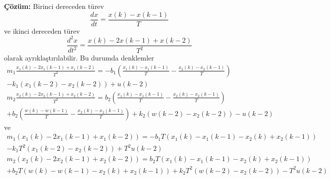 \noindent\textbf{Çözüm:} 
Birinci dereceden türev
\begin{equation}
    \frac{dx}{dt}=\frac{x(k)-x(k-1)}{T}
\end{equation}
ve ikinci dereceden türev 
\begin{equation}
    \frac{d^2x}{dt^2}=\frac{x(k)-2x(k-1)+x(k-2)}{T^2}
\end{equation}
olarak ayrıklaştırılabilir. Bu durumda denklemler
\begin{equation}
\begin{split}
m_1\frac{x_1(k)-2x_1(k-1)+x_1(k-2)}{T^2}=-b_1\left(\frac{x_1(k)-x_1(k-1)}{T}-\frac{x_2(k)-x_2(k-1)}{T}\right)\\-k_1(x_1(k-2)-x_2(k-2))+u(k-2)\\
m_2\frac{x_2(k)-2x_2(k-1)+x_2(k-2)}{T^2}=b_2\left(\frac{x_1(k)-x_1(k-1)}{T}-\frac{x_2(k)-x_2(k-1)}{T}\right)\\+b_2\left(\frac{w(k)-w(k-1)}{T}-\frac{x_2(k)-x_2(k-1)}{T}\right)+k_2(w(k-2)-x_2(k-2))-u(k-2)
\end{split}
\end{equation}
ve
\begin{equation}
    \begin{split}
    m_1(x_1(k)-2x_1(k-1)+x_1(k-2))=-b_1T(x_1(k)-x_1(k-1)-x_2(k)+x_2(k-1))\\
    -k_1T^2(x_1(k-2)-x_2(k-2))+T^2u(k-2)\\
    m_2(x_2(k)-2x_2(k-1)+x_2(k-2))=b_2T(x_1(k)-x_1(k-1)-x_2(k)+x_2(k-1))\\
    +b_2T(w(k)-w(k-1)-x_2(k)+x_2(k-1))+k_2T^2(w(k-2)-x_2(k-2))-T^2u(k-2)
    \end{split}
\end{equation}
